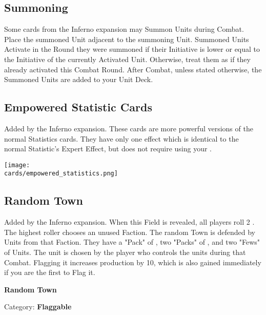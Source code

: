 \begin{multicols*}{2}
\subsection*{Summoning}
Some cards from the Inferno expansion may Summon Units during Combat.
Place the summoned Unit adjacent to the summoning Unit.
Summoned Units Activate in the Round they were summoned if their Initiative is lower or equal to the Initiative of the currently Activated Unit.
Otherwise, treat them as if they already activated this Combat Round.
After Combat, unless stated otherwise, the Summoned Units are added to your Unit Deck.

\subsection*{Empowered Statistic Cards}
Added by the Inferno expansion.
These cards are more powerful versions of the normal Statistics cards.
They have only one effect which is identical to the normal Statistic's Expert Effect, but does not require using your .

\begin{center}
  \texttt{[image: \\cards/empowered\_statistics.png]}
\end{center}

\subsection*{Random Town}
Added by the Inferno expansion.
When this Field is revealed, all players roll 2 .
The highest roller chooses an unused Faction.
The random Town is defended by Units from that Faction.
They have a "Pack" of , two "Packs" of , and two "Fews" of  Units.
The  unit is chosen by the player who controls the units during that Combat.
Flagging it increases  production by 10, which is also gained immediately if you are the first to Flag it.

\bigskip

\begin{minipage}[h]{\linewidth}
  \begin{center}
    \textbf{Random Town}\medskip
  \end{center}
  \small{Category: \textbf{Flaggable}}
\end{minipage}

\end{multicols*}
